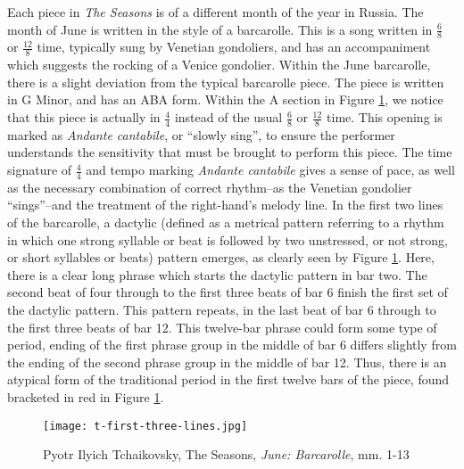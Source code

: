 Each piece in \textit{The Seasons} is of a different month of the year in Russia. The month of June is written in the style of a barcarolle. This is a song written in $\frac{6}{8}$ or $\frac{12}{8}$ time, typically sung by Venetian gondoliers, and has an accompaniment which suggests the rocking of a Venice gondolier\autocite{Latham_2011b}. Within the June barcarolle, there is a slight deviation from the typical barcarolle piece. The piece is written in G Minor, and has an ABA form. Within the A section in Figure \ref{fig:t-first-three-lines}, we notice that this piece is actually in $\frac{4}{4}$ instead of the usual $\frac{6}{8}$ or $\frac{12}{8}$ time. This opening is marked as \textit{Andante cantabile}, or ``slowly sing'', to ensure the performer understands the sensitivity that must be brought to perform this piece. The time signature of $\frac{4}{4}$ and tempo marking \textit{Andante cantabile} gives a sense of pace, as well as the necessary combination of correct rhythm--as the Venetian gondolier ``sings''--and the treatment of the right-hand's melody line. In the first two lines of the barcarolle, a dactylic (defined as a metrical pattern referring to a rhythm in which one strong syllable or beat is followed by two unstressed, or not strong, or short syllables or beats)\autocite{Cambridge_University_Press_Assessment} pattern emerges, as clearly seen by Figure \ref{fig:t-first-three-lines}\autocite{Henle_2002}. Here, there is a clear long phrase which starts the dactylic pattern in bar two. The second beat of four through to the first three beats of bar 6 finish the first set of the dactylic pattern. This pattern repeats, in the last beat of bar 6 through to the first three beats of bar 12. This twelve-bar phrase could form some type of period, ending of the first phrase group in the middle of bar 6 differs slightly from the ending of the second phrase group in the middle of bar 12. Thus, there is an atypical form of the traditional period in the first twelve bars of the piece, found bracketed in red in Figure \ref{fig:t-first-three-lines}\autocite{Henle_2002}. 

\begin{figure}[h]
  \centering
  \texttt{[image: t-first-three-lines.jpg]}
  \caption{Pyotr Ilyich Tchaikovsky, The Seasons, \textit{June: Barcarolle}, mm. 1-13}
  \label{fig:t-first-three-lines}
\end{figure}

